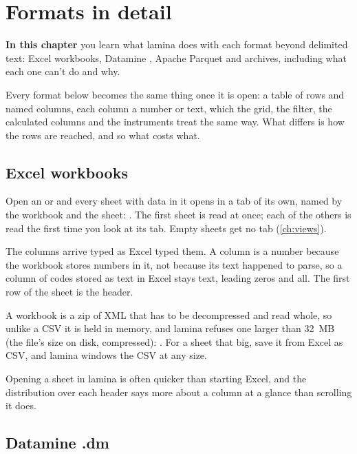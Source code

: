 \chapter{Formats in detail}\label{ch:formats}
\begin{goals}
\textbf{In this chapter} you learn what lamina does with each format beyond delimited text: Excel
workbooks, Datamine , Apache Parquet and archives, including what each one can't do and why.
\end{goals}

Every format below becomes the same thing once it is open: a table of rows and named columns, each
column a number or text, which the grid, the filter, the calculated columns and the instruments treat
the same way. What differs is how the rows are reached, and so what costs what.

\section{Excel workbooks}\label{sec:xlsx}

Open an  or  and every sheet with data in it opens in a tab of its own, named
by the workbook and the sheet: . The first sheet is read at once; each of the
others is read the first time you look at its tab. Empty sheets get no tab (\cref{ch:views}).

The columns arrive typed as Excel typed them. A column is a number because the workbook stores numbers
in it, not because its text happened to parse, so a column of codes stored as text in Excel stays text,
leading zeros and all. The first row of the sheet is the header.

A workbook is a zip of XML that has to be decompressed and read whole, so unlike a CSV it is held in
memory, and lamina refuses one larger than 32~MB (the file's size on disk, compressed):
. For a sheet that big, save it from Excel as CSV, and lamina windows the CSV at
any size.

\begin{tip}
Opening a sheet in lamina is often quicker than starting Excel, and the distribution over each header
says more about a column at a glance than scrolling it does.
\end{tip}

\section{Datamine .dm}\label{sec:dm}


